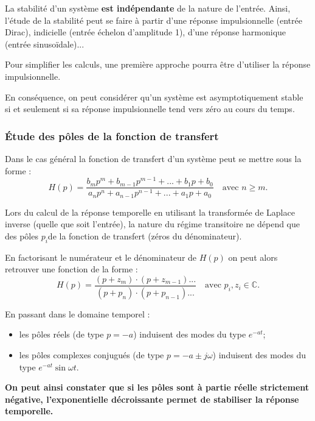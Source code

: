 \begin{remarque}
La stabilité d'un système \textbf{est indépendante} de la nature de l'entrée. Ainsi, l'étude de la stabilité peut se faire à partir d'une réponse impulsionnelle (entrée Dirac), indicielle (entrée échelon d'amplitude 1), d'une réponse harmonique (entrée sinusoïdale)...

Pour simplifier les calculs, une première approche pourra être d'utiliser la réponse impulsionnelle. 
\end{remarque}
\begin{defi}{}
En conséquence, on peut considérer qu'un système est asymptotiquement stable si et seulement si sa réponse impulsionnelle tend vers zéro au cours du temps.
\end{defi}

\subsubsection{Étude des pôles de la fonction de transfert}
Dans le cas général la fonction de transfert d'un système peut se mettre sous la forme :
$$
H(p)=\dfrac{b_mp^m + b_{m-1}p^{m-1}+...+b_1p+b_0}{a_np^n + a_{n-1}p^{n-1}+...+a_1p+a_0} \quad \text{avec } n\geq m.
$$

Lors du calcul de la réponse temporelle en utilisant la transformée de Laplace inverse (quelle que soit l'entrée), la nature du régime transitoire ne dépend que des pôles $p_i$de la fonction de transfert (zéros du dénominateur).

En factorisant le numérateur et le dénominateur de $H(p)$ on peut alors retrouver une fonction de la forme  :
$$
H(p)=\dfrac{\left(p+ z_m\right)\cdot \left(p+ z_{m-1}\right)...}{\left(p+ p_n\right)\cdot \left(p+ p_{n-1}\right)...} \quad \text{avec } p_i,z_i\in \mathbb{C}.
$$

En passant dans le domaine temporel : 
\begin{itemize}
\item les pôles réels (de type $p=-a$) induisent des modes  du type $e^{-at}$;
\item les pôles complexes conjugués (de type $p=-a\pm j\omega$) induisent des modes du type 
$e^{-at} \sin \omega t$.
\end{itemize}

\textbf{On peut ainsi constater que si les pôles sont à partie réelle strictement négative, l'exponentielle décroissante permet de stabiliser la réponse temporelle.}

